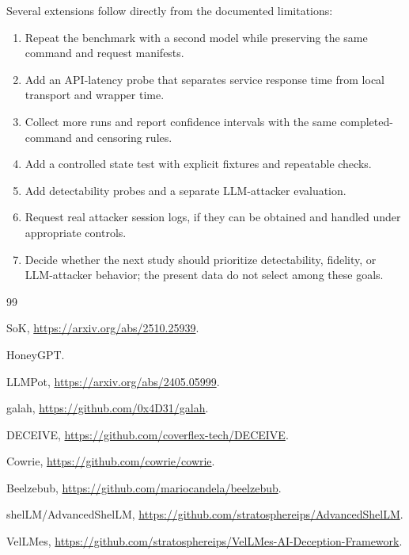 \documentclass[a4paper,11pt]{article}
\begin{document}
Several extensions follow directly from the documented limitations:

\begin{enumerate}[leftmargin=*]
\item Repeat the benchmark with a second model while preserving the same
command and request manifests.
\item Add an API-latency probe that separates service response time from
local transport and wrapper time.
\item Collect more runs and report confidence intervals with the same
completed-command and censoring rules.
\item Add a controlled state test with explicit fixtures and repeatable
checks.
\item Add detectability probes and a separate LLM-attacker evaluation.
\item Request real attacker session logs, if they can be obtained and handled
under appropriate controls.
\item Decide whether the next study should prioritize detectability, fidelity,
or LLM-attacker behavior; the present data do not select among these goals.
\end{enumerate}

\begin{thebibliography}{99}

SoK, \url{https://arxiv.org/abs/2510.25939}.

HoneyGPT.

LLMPot, \url{https://arxiv.org/abs/2405.05999}.

galah, \url{https://github.com/0x4D31/galah}.

DECEIVE, \url{https://github.com/coverflex-tech/DECEIVE}.

Cowrie, \url{https://github.com/cowrie/cowrie}.

Beelzebub, \url{https://github.com/mariocandela/beelzebub}.

shelLM/AdvancedShelLM, \url{https://github.com/stratosphereips/AdvancedShelLM}.

VelLMes, \url{https://github.com/stratosphereips/VelLMes-AI-Deception-Framework}.

\end{thebibliography}
\end{document}
